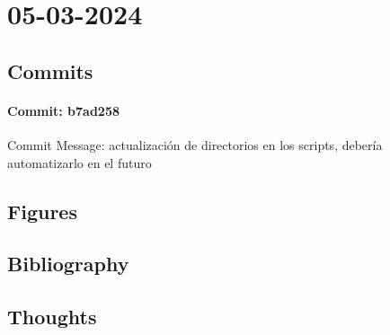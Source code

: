 \documentclass{article}
\begin{document}
\section{05-03-2024}
\subsection{Commits}
\paragraph{Commit: b7ad258}
Commit Message: actualización de directorios en los scripts, debería automatizarlo en el futuro

\subsection{Figures}
\subsection{Bibliography}
\subsection{Thoughts}
\end{document}
